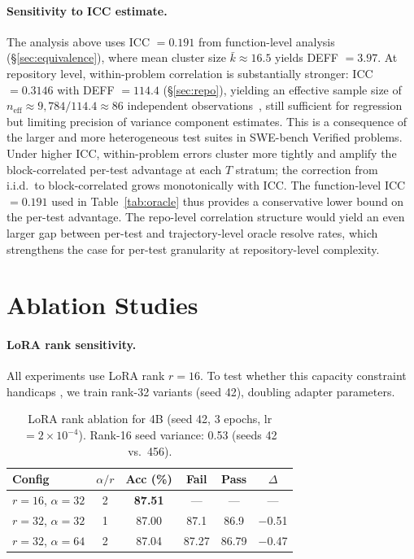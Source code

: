 \paragraph{Sensitivity to ICC estimate.}
The analysis above uses ICC $= 0.191$ from function-level analysis (\S\ref{sec:equivalence}), where mean cluster size $\bar{k} \approx 16.5$ yields DEFF $= 3.97$. At repository level, within-problem correlation is substantially stronger: ICC $= 0.3146$ with DEFF $= 114.4$ (\S\ref{sec:repo}), yielding an effective sample size of $n_{\text{eff}} \approx 9{,}784 / 114.4 \approx 86$ independent observations~\cite{moulton1990}, still sufficient for regression but limiting precision of variance component estimates. This is a consequence of the larger and more heterogeneous test suites in SWE-bench Verified problems. Under higher ICC, within-problem errors cluster more tightly and amplify the block-correlated per-test advantage at each $T$ stratum; the correction from i.i.d.\ to block-correlated grows monotonically with ICC. The function-level ICC $= 0.191$ used in Table~\ref{tab:oracle} thus provides a conservative lower bound on the per-test advantage. The repo-level correlation structure would yield an even larger gap between per-test and trajectory-level oracle resolve rates, which strengthens the case for per-test granularity at repository-level complexity.

\section{Ablation Studies}
\label{app:ablations}

\paragraph{LoRA rank sensitivity.}
All \cwm{} experiments use LoRA rank $r{=}16$. To test whether this capacity constraint handicaps \cwm{}, we train rank-32 variants (seed 42), doubling adapter parameters.

\begin{table}[h]
\centering
\small
\caption{LoRA rank ablation for \cwm{} 4B (seed 42, 3 epochs, lr $= 2{\times}10^{-4}$). Rank-16 seed variance: 0.53\pp{} (seeds 42 vs.\ 456).}
\label{tab:rank_ablation}
\setlength{\tabcolsep}{4pt}
\begin{tabular}{lccccc}
\toprule
\textbf{Config} & \textbf{$\alpha/r$} & \textbf{Acc (\%)} & \textbf{Fail \fone{}} & \textbf{Pass \fone{}} & \textbf{$\Delta$} \\
\midrule
$r{=}16$, $\alpha{=}32$ & 2 & \textbf{87.51} & --- & --- & --- \\
$r{=}32$, $\alpha{=}32$ & 1 & 87.00 & 87.1 & 86.9 & $-$0.51 \\
$r{=}32$, $\alpha{=}64$ & 2 & 87.04 & 87.27 & 86.79 & $-$0.47 \\
\bottomrule
\end{tabular}
\end{table}

